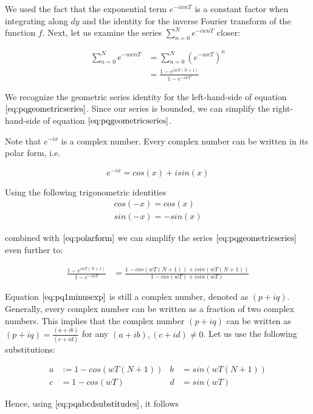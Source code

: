 We used the fact that the exponential term $e^{-iwnT}$ is a constant factor when integrating along $dy$ and the identity for the inverse Fourier transform of the function $f$. Next, let us examine the series $\sum_{n=0}^N e^{-iwnT}$ closer:

\begin{align}
\sum_{n=0}^N e^{-uwnT}
& =\sum_{n=0}^N (e^{-uwT})^n \nonumber \\
& =\frac{1-e^{iwT(N+1)}}{1-e^{-iwT}}
\label{eq:pqgeometricseries}
\end{align}

We recognize the geometric series identity for the left-hand-side of equation $\ref{eq:pqgeometricseries}$. Since our series is bounded, we can simplify the right-hand-side of equation $\ref{eq:pqgeometricseries}$.

Note that $e^{-ix}$ is a complex number. Every complex number can be written in its polar form, i.e. 

\begin{equation}
e^{-ix} = cos(x) + i sin(x) 
\label{eq:polarform}
\end{equation}

Using the following trigonometric identities
\begin{gather}
cos(-x) = cos(x) \nonumber \\
sin(-x) = -sin(x)
\end{gather}

combined with $\ref{eq:polarform}$ we can simplify the series $\ref{eq:pqgeometricseries}$ even further to:

\begin{align}
\frac{1-e^{iwT(N+1)}}{1-e^{-iwT}}
& =\frac{1-cos(wT(N+1)) + i sin(wT(N+1)) }{1-cos(wT) + i sin(wT)}
\label{eq:pq1minusexp}
\end{align}

Equation $\ref{eq:pq1minusexp}$ is still a complex number, denoted as $(p+iq)$. Generally, every complex number can be written as a fraction of two complex numbers. This implies that the complex number $(p+iq)$ can be written as $(p+iq) = \frac{(a+ib)}{(c+id)}$ for any $(a+ib), (c+id) \neq 0$. Let us use the following substitutions: 

\begin{align}
a& := 1 - cos(wT(N+1))&
b& =sin(wT(N+1)) \nonumber \\
c& =1-cos(wT)&
d& =sin(wT)
\label{eq:pqabcdsubstitudes}
\end{align}

Hence, using $\ref{eq:pqabcdsubstitudes}$, it follows 

